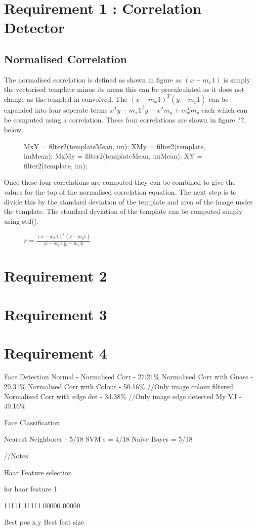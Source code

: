 

\section{Requirement 1 : Correlation Detector}

\subsection{Normalised Correlation}

The normalised correlation is defined as shown in figure as $(x-m_x1)$ is simply
the vectorised template minus its mean this can be precalculated as it does not
change as the templed in convolved. The $(x-m_x1)^T(y-m_y1)$ can be expanded into
four seperate terms $x^Ty - m_x1^Ty - x^Tm_y + m_x^Tm_y$ each which can be computed
using a correlation. These four correlations are shown in figure ??, below.

\begin{figure}
MxY = filter2(templateMean, im);
XMy = filter2(template, imMean);
MxMy = filter2(templateMean, imMean);
XY = filter2(template, im);
\end{figure}

Once these four correlations are computed they can be combined to give the values
for the top of the normalised correlation equation. The next step is to divide
this by the standard deviation of the template and area of the image under the
template. The standard deviation of the template can be computed simply using
std().


\begin{figure}
$r=\frac{(x-m_x1)^T(y-m_y1)}{|x-m_x1||y-m_x1|}$
\end{figure}

\section{Requirement 2}

\section{Requirement 3}

\section{Requirement 4}

Face Detection
Normal -
Normalised Corr - 27.21\%
Normalised Corr with Guass - 29.31\%
Normalised Corr with Colour - 50.16\% //Only image colour filtered
Normalised Corr with edge det - 34.38\% //Only image edge detected
My VJ - 49.16\%

Face Classification

Nearest Neighborer - 5/18
SVM's = 4/18
Naive Bayes = 5/18




//Notes

Haar Feature selection

for haar feature 1

11111
11111
00000
00000

Best pos x,y
Best feat size